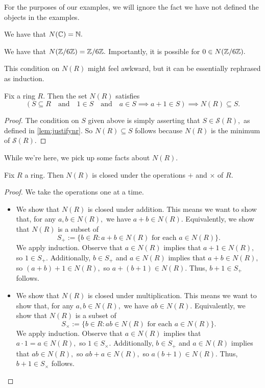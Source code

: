 \documentclass{article}
\begin{document}
For the purposes of our examples, we will ignore the fact we have not defined the objects in the examples.
\begin{example}
	We have that $N(\mathbb C)=\mathbb N.$
\end{example}
\begin{example}
	We have that $N(\mathbb Z/6\mathbb Z)=\mathbb Z/6\mathbb Z.$ Importantly, it is possible for $0\in N(\mathbb Z/6\mathbb Z).$
\end{example}
This condition on $N(R)$ might feel awkward, but it can be essentially rephrased as induction.
\begin{corollary}[Induction]
	Fix a ring $R.$ Then the set $N(R)$ satisfies
	\[(S\subseteq R\quad\text{and}\quad1\in S\quad\text{and}\quad a\in S\implies a+1\in S)\implies N(R)\subseteq S.\]
\end{corollary}
\begin{proof}
	The condition on $S$ given above is simply asserting that $S\in \mathcal S(R),$ as defined in \autoref{lem:justifynr}. So $N(R)\subseteq S$ follows because $N(R)$ is the minimum of $\mathcal S(R).$
\end{proof}
While we're here, we pick up some facts about $N(R).$
\begin{proposition} \label{prop:natclosed}
	Fix $R$ a ring. Then $N(R)$ is closed under the operations $+$ and $\times$ of $R.$
\end{proposition}
\begin{proof}
	We take the operations one at a time.
	\begin{itemize}
		\item We show that $N(R)$ is closed under addition. This means we want to show that, for any $a,b\in N(R),$ we have $a+b\in N(R).$ Equivalently, we show that $N(R)$ is a subset of
		\[S_+:=\{b\in R:a+b\in N(R)\text{ for each }a\in N(R)\}.\]
		We apply induction. Observe that $a\in N(R)$ implies that $a+1\in N(R),$ so $1\in S_+.$ Additionally, $b\in S_+$ and $a\in N(R)$ implies that $a+b\in N(R),$ so $(a+b)+1\in N(R),$ so $a+(b+1)\in N(R).$ Thus, $b+1\in S_+$ follows.
		\item We show that $N(R)$ is closed under multiplication. This means we want to show that, for any $a,b\in N(R),$ we have $ab\in N(R).$ Equivalently, we show that $N(R)$ is a subset of
		\[S_\times:=\{b\in R:ab\in N(R)\text{ for each }a\in N(R)\}.\]
		We apply induction. Observe that $a\in N(R)$ implies that $a\cdot1=a\in N(R),$ so $1\in S_\times.$ Additionally, $b\in S_+$ and $a\in N(R)$ implies that $ab\in N(R),$ so $ab+a\in N(R),$ so $a(b+1)\in N(R).$ Thus, $b+1\in S_\times$ follows.
		\qedhere
	\end{itemize}
\end{proof}
\end{document}
